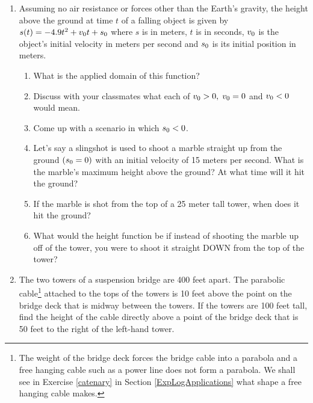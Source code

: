 \documentclass{ximera}
\begin{document}
\begin{enumerate}
\item Assuming no air resistance or forces other than the Earth's gravity, the height above the ground at time $t$ of a falling object is given by $s(t) = -4.9t^{2} + v_{\mbox{\scriptsize $0$}}t + s_{\mbox{\scriptsize $0$}}$ where $s$ is in meters, $t$ is in seconds, $v_{\mbox{\scriptsize $0$}}$ is the object's initial velocity in meters per second and $s_{\mbox{\scriptsize $0$}}$ is its initial position in meters.  
\label{whatgoesup}

\begin{enumerate}

\item What is the applied domain of this function?
\item Discuss with your classmates what each of $v_{\mbox{\scriptsize $0$}} > 0, \; v_{\mbox{\scriptsize $0$}} = 0$ and $v_{\mbox{\scriptsize $0$}} < 0$ would mean.
\item Come up with a scenario in which $s_{\mbox{\scriptsize $0$}} < 0$.
\item Let's say a slingshot is used to shoot a marble straight up from the ground $(s_{\mbox{\scriptsize $0$}} = 0)$ with an initial velocity of 15 meters per second.  What is the marble's maximum height above the ground?  At what time will it hit the ground?
\item If the marble is shot from the top of a 25 meter tall tower,  when does it hit the ground?
\item What would the height function be if instead of shooting the marble up off of the tower, you were to shoot it straight DOWN from the top of the tower?

\end{enumerate}


\item \label{parabolicbridgecable} The two towers of a suspension bridge are 400 feet apart.  The parabolic cable\footnote{The weight of the bridge deck forces the bridge cable into a parabola and a free hanging cable such as a power line does not form a parabola.  We shall see in Exercise \ref{catenary} in Section \ref{ExpLogApplications} what shape a free hanging cable makes.} attached to the tops of the towers is 10 feet above the point on the bridge deck that is midway between the towers.  If the towers are 100 feet tall, find the height of the cable directly above a point of the bridge deck that is 50 feet to the right of the left-hand tower.


\end{enumerate}
\end{document}
